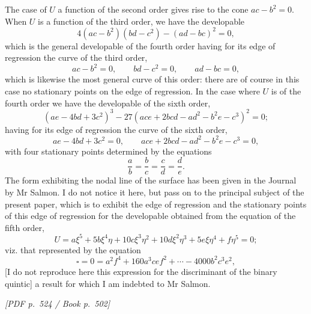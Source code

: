 \documentclass[11pt]{article}
\newcommand{\Page}[2]{\bigskip\noindent\textit{[PDF p.~#1 / Book p.~#2]}\par\smallskip}
\newcommand{\sq}{\square}
\begin{document}
The case of $U$ a function of the second order gives rise to the cone $ac-b^2=0$.
When $U$ is a function of the third order, we have the developable
\[
        4(ac-b^2)(bd-c^2)-(ad-bc)^2=0,
\]
which is the general developable of the fourth order having for its edge of regression
the curve of the third order,
\[
        ac-b^2=0,\qquad bd-c^2=0,\qquad ad-bc=0,
\]
which is likewise the most general curve of this order: there are of course in this
case no stationary points on the edge of regression. In the case where $U$ is of the
fourth order we have the developable of the sixth order,
\[
        (ae-4bd+3c^2)^3-27(ace+2bcd-ad^2-b^2e-c^3)^2=0;
\]
having for its edge of regression the curve of the sixth order,
\[
        ae-4bd+3c^2=0,\qquad ace+2bcd-ad^2-b^2e-c^3=0,
\]
with four stationary points determined by the equations
\[
        \frac{a}{b}=\frac{b}{c}=\frac{c}{d}=\frac{d}{e}.
\]
The form exhibiting the nodal line of the surface has been given in the Journal by
Mr Salmon. I do not notice it here, but pass on to the principal subject of the
present paper, which is to exhibit the edge of regression and the stationary points of
this edge of regression for the developable obtained from the equation of the fifth
order,
\[
        U=a\xi^5+5b\xi^4\eta+10c\xi^3\eta^2
        +10d\xi^2\eta^3+5e\xi\eta^4+f\eta^5=0;
\]
viz. that represented by the equation
\[
        \sq=0=a^2f^4+160a^3cef^2+\cdots-4000b^2c^3e^2,
\]
[I do not reproduce here this expression for the discriminant of the binary quintic]
a result for which I am indebted to Mr Salmon.

\Page{524}{502}
\end{document}

